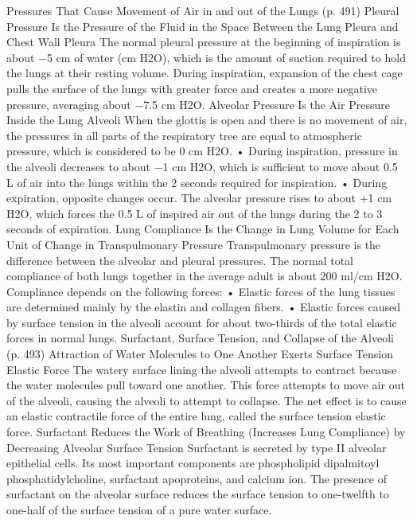 Pressures That Cause Movement of Air in and out of the Lungs (p. 491) Pleural Pressure Is the Pressure of the Fluid in the Space Between the Lung Pleura and Chest Wall Pleura The normal pleural pressure at the beginning of inspiration is about −5 cm of water (cm H2O), which is the amount of suction required to hold the lungs at their resting volume. During inspiration, expansion of the chest cage pulls the surface of the lungs with greater force and creates a more negative pressure, averaging about −7.5 cm H2O. Alveolar Pressure Is the Air Pressure Inside the Lung Alveoli When the glottis is open and there is no movement of air, the pressures in all parts of the respiratory tree are equal to atmospheric pressure, which is considered to be 0 cm H2O. • During inspiration, pressure in the alveoli decreases to about −1 cm H2O, which is sufficient to move about 0.5 L of air into the lungs within the 2 seconds required for inspiration. • During expiration, opposite changes occur. The alveolar pressure rises to about +1 cm H2O, which forces the 0.5 L of inspired air out of the lungs during the 2 to 3 seconds of expiration. Lung Compliance Is the Change in Lung Volume for Each Unit of Change in Transpulmonary Pressure Transpulmonary pressure is the difference between the alveolar and pleural pressures. The normal total compliance of both lungs together in the average adult is about 200 ml/cm H2O. Compliance depends on the following forces: • Elastic forces of the lung tissues are determined mainly by the elastin and collagen fibers. • Elastic forces caused by surface tension in the alveoli account for about two-thirds of the total elastic forces in normal lungs. Surfactant, Surface Tension, and Collapse of the Alveoli (p. 493) Attraction of Water Molecules to One Another Exerts Surface Tension Elastic Force The watery surface lining the alveoli attempts to contract because the water molecules pull toward one another. This force attempts to move air out of the alveoli, causing the alveoli to attempt to collapse. The net effect is to cause an elastic contractile force of the entire lung, called the surface tension elastic force. Surfactant Reduces the Work of Breathing (Increases Lung Compliance) by Decreasing Alveolar Surface Tension Surfactant is secreted by type II alveolar epithelial cells. Its most important components are phospholipid dipalmitoyl phosphatidylcholine, surfactant apoproteins, and calcium ion. The presence of surfactant on the alveolar surface reduces the surface tension to one-twelfth to one-half of the surface tension of a pure water surface.



